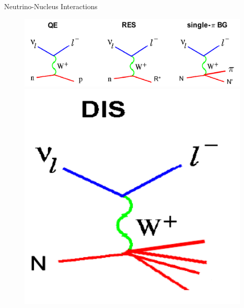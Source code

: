 \documentclass[9pt]{beamer}    %
\begin{document}
\begin{frame}{Neutrino-Nucleus Interactions}
\begin{figure}
 \includegraphics[scale=.15]{allprocess.jpg}
 \includegraphics[scale=.15]{dis.jpg}
\end{figure}
\end{frame}
\end{document}
